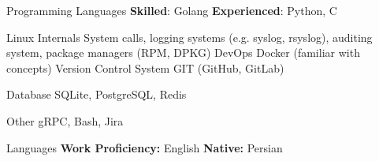 

\begin{cvskills}


  \cvskill
    {Programming Languages} %
    {\textbf{Skilled}: Golang \qquad \textbf{Experienced}: Python, C } %

  \cvskill
    {Linux Internals} %
    {System calls, logging systems (e.g. syslog, rsyslog), auditing system, package managers (RPM, DPKG)} %
  \cvskill
    {DevOps} %
    {Docker (familiar with concepts)} %
  \cvskill
    {Version Control System} %
    {GIT (GitHub, GitLab)} %

  \cvskill
    {Database} %
    {SQLite, PostgreSQL, Redis} %

  \cvskill
    {Other} %
    {gRPC, Bash, Jira} %

  \cvskill
    {Languages} %
    {\textbf{Work Proficiency:} English \qquad \textbf{Native:} Persian} %

\end{cvskills}
